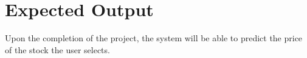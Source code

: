 \section{Expected Output}
\vspace{-18pt}
Upon the completion of the project, the system will be able to predict the price of the stock the user selects.
\renewcommand\bibname{References} %

